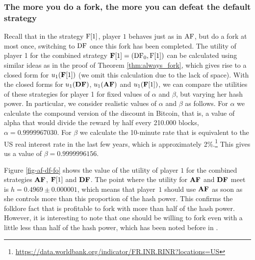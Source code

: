 \subsubsection{The more you do a fork, the more you can defeat the default strategy}
Recall that in the strategy $\text{\rm F[{1}]}$, player $1$ behaves just as in $\text{\rm AF}$, but do a fork at most once, 
switching to $\text{\rm DF}$ once this fork has been completed.
The utility of player 1 for the combined strategy $\text{\rm {\bf F}[{$1$}]} = (\text{\rm DF}_0, \text{\rm F[{1}]})$ can be calculated using similar ideas as in the proof of Theorem \ref{thm:always_fork}, which gives rise to a closed form for $u_1(\text{\rm {\bf F}[{$1$}]})$ (we omit this calculation due to the lack of space). With the closed forms for $u_1(\text{\rm {\bf DF}})$, $u_1(\text{\rm {\bf AF}})$ and $u_1(\text{\rm {\bf F}[{$1$}]})$, we can compare the utilities of these strategies for player 1 for fixed values of $\alpha$ and $\beta$, but varying her hash power. In particular, we consider realistic values of $\alpha$ and $\beta$ as follows. For $\alpha$ we calculate the compound version of the discount in Bitcoin, that is, 
a value of alpha that would divide the reward by half every 210.000 blocks, \ie $\alpha = 0.9999967030$. For 
$\beta$ we calculate the 10-minute rate that is equivalent to the US real interest rate in 
the last few years, which is approximately 2\%.\footnote{\url{https://data.worldbank.org/indicator/FR.INR.RINR?locations=US}}
This gives us a value of $\beta = 0.9999996156$. 
                      								     
Figure \ref{fig-af-df-fo} shows the value of the utility of player $1$ for the combined strategies $\text{\rm {\bf AF}}$, $\text{\rm {\bf F}[{$1$}]}$ and $\text{\rm {\bf DF}}$.
The point where the utility for $\text{\rm {\bf AF}}$ and $\text{\rm {\bf DF}}$ meet is $h = 0.4969 \pm 0.000001$,
which means that player~$1$ should use $\text{\rm {\bf AF}}$ as soon as she controls more than this proportion of the hash power. 
This confirms the 
folklore fact that is profitable to fork with more than half of the hash power. However, it is interesting to note that
one should be willing to fork even with a little less than half of the hash power, which has been noted before in  \cite{}. 

